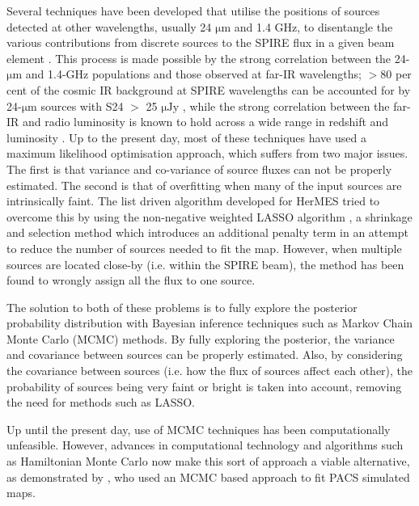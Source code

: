\documentclass[useAMS,usenatbib]{mnras}
\begin{document}
Several techniques have been developed that utilise the positions of sources detected at other wavelengths, usually 24 $\mathrm{\mu m}$ and 1.4 GHz, to disentangle the various contributions from discrete sources to the SPIRE flux in a given beam element \citep[e.g.][]{Roseboom:2010, Roseboom:2011, Chapin:2011}. This process is made possible by the strong correlation between the 24-$\mathrm{\mu m}$ and 1.4-GHz populations and those observed at far-IR wavelengths; $>$80 per cent of the cosmic IR background at SPIRE wavelengths can be accounted for by 24-$\mathrm{\mu m}$ sources with S24 $>$ 25 $\mathrm{\mu Jy}$ \citep[e.g.][]{Marsden:2009, Pascale:2009, Elbaz:2010, Bethermin:2012}, while the strong correlation between the far-IR and radio luminosity is known to hold across a wide range in redshift and luminosity \citep[e.g.][]{Ivison:2010}. Up to the present day, most of these techniques have used a maximum likelihood optimisation approach, which suffers from two major issues. The first is that variance and co-variance of source fluxes can not be properly estimated. The second is that of overfitting when many of the input sources are intrinsically faint. The list driven algorithm developed for HerMES \citep[DESPHOT][]{Roseboom:2011,Wang:2014} tried to overcome this by using the non-negative weighted LASSO algorithm \citep{Tibshirani:1996, Zou:2006, terBraak:2010}, a shrinkage and selection method which introduces an additional penalty term in an attempt to reduce the number of sources needed to fit the map. However, when multiple sources are located close-by (i.e. within the SPIRE beam), the method has been found to wrongly assign all the flux to one source. 

The solution to both of these problems is to fully explore the posterior probability distribution with Bayesian inference techniques such as Markov Chain Monte Carlo (MCMC) methods. By fully exploring the posterior, the variance and covariance between sources can be properly estimated. Also, by considering the covariance between sources (i.e. how the flux of sources affect each other), the probability of sources being very faint or bright is taken into account, removing the need for methods such as LASSO. 

Up until the present day, use of MCMC techniques has been computationally unfeasible. However, advances in computational technology and algorithms such as Hamiltonian Monte Carlo now make this sort of approach a viable alternative, as demonstrated by \cite{Safarzadeh:2015}, who used an MCMC based approach to fit PACS simulated maps.
 
\end{document}
